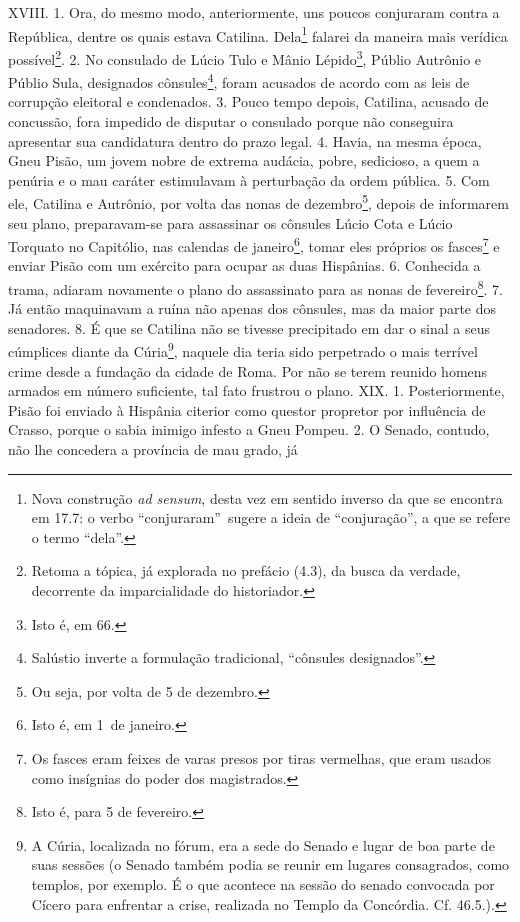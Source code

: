XVIII. 1. Ora, do mesmo modo, anteriormente, uns poucos conjuraram contra a República, dentre os quais estava Catilina. Dela\footnote{Nova construção \emph{ad
sensum}, desta vez em sentido inverso da que se encontra em 17.7: o verbo
``conjuraram''\ sugere a ideia de ``conjuração'', a que se refere o termo
``dela''.} falarei da maneira mais verídica possível\footnote{Retoma a tópica,
já explorada no prefácio (4.3), da busca da verdade, decorrente da
imparcialidade do historiador.}. 2. No consulado de Lúcio Tulo e Mânio
Lépido\footnote{Isto é, em 66.}, Públio Autrônio e Públio Sula, designados
cônsules\footnote{Salústio inverte a formulação tradicional, ``cônsules
designados''.}, foram acusados de acordo com as leis de corrupção eleitoral e
condenados. 3. Pouco tempo depois, Catilina, acusado de concussão, fora
impedido de disputar o consulado porque não conseguira apresentar sua
candidatura dentro do prazo legal. 4. Havia, na mesma época, Gneu Pisão, um
jovem nobre de extrema audácia, pobre, sedicioso, a quem a penúria e o mau
caráter estimulavam à perturbação da ordem pública. 5. Com ele, Catilina e
Autrônio, por volta das nonas de dezembro\footnote{Ou seja, por volta de 5 de
dezembro.}, depois de informarem seu plano, preparavam-se para assassinar os
cônsules Lúcio Cota e Lúcio Torquato no Capitólio, nas calendas de
janeiro\footnote{Isto é, em 1\oi\ de janeiro.}, tomar eles próprios os
fasces\footnote{Os fasces eram feixes de varas presos por tiras vermelhas, que
eram usados como insígnias do poder dos magistrados.} e enviar Pisão com um
exército para ocupar as duas Hispânias. 6. Conhecida a trama, adiaram novamente
o plano do assassinato para as nonas de fevereiro\footnote{Isto é, para 5 de
fevereiro.}. 7. Já então maquinavam a ruína não apenas dos cônsules, mas da
maior parte dos senadores. 8. É que se Catilina não se tivesse precipitado em
dar o sinal a seus cúmplices diante da Cúria\footnote{A Cúria, localizada no
fórum, era a sede do Senado e lugar de boa parte de suas sessões (o Senado
também podia se reunir em lugares consagrados, como templos, por exemplo. É o
que acontece na sessão do senado convocada por Cícero para enfrentar a crise,
realizada no Templo da Concórdia. Cf. 46.5.).}, naquele dia teria sido
perpetrado o mais terrível crime desde a fundação da cidade de Roma. Por não se
terem reunido homens armados em número suficiente, tal fato frustrou o plano.
XIX. 1. Posteriormente, Pisão foi enviado à Hispânia citerior como questor
propretor por influência de Crasso, porque o sabia inimigo infesto a Gneu
Pompeu. 2. O Senado, contudo, não lhe concedera a província de mau grado, já
